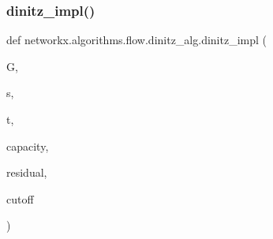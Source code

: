 \subsubsection{\texorpdfstring{dinitz\+\_\+impl()}{dinitz\_impl()}}
{\footnotesize\ttfamily def networkx.\+algorithms.\+flow.\+dinitz\+\_\+alg.\+dinitz\+\_\+impl (\begin{DoxyParamCaption}\item[{}]{G,  }\item[{}]{s,  }\item[{}]{t,  }\item[{}]{capacity,  }\item[{}]{residual,  }\item[{}]{cutoff }\end{DoxyParamCaption})}

